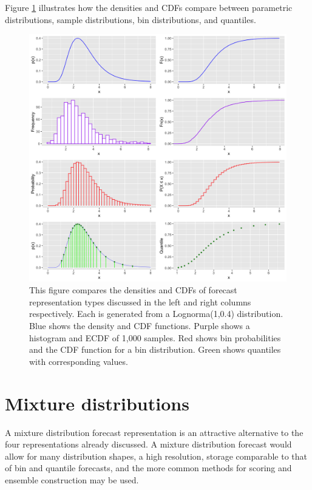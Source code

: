 \documentclass[11pt,notitlepage]{isuthesis}
\begin{document}
Figure \ref{fig:denscomp} illustrates how the densities and CDFs compare 
between parametric distributions, sample distributions, bin distributions, and
quantiles. 

\begin{figure}[htbp]
\begin{center}

\captionsetup{font=scriptsize}
\centerline{\includegraphics[scale=.1]{Images/dens_cum_comp.png}}
\begin{minipage}{10cm}
\caption[Density/CDF comparison between parametric distribution, sample 
distribution, discretized bin distribution and quantiles]{This figure compares 
the
densities and CDFs of forecast representation types discussed in the left and 
right columns respectively. Each is generated from a Lognorma(1,0.4) 
distribution. Blue shows the density and CDF functions. Purple shows a 
histogram and ECDF of 1,000 samples. Red shows bin probabilities and the CDF
function for a bin distribution. Green shows quantiles
with corresponding values.}
\label{fig:denscomp}
\end{minipage}
\end{center}
\end{figure}


\newpage

\section{Mixture distributions}
A mixture distribution forecast representation is an
attractive alternative to the four representations already discussed. 
A mixture distribution forecast
would allow for many distribution shapes, a high resolution, storage comparable
to that of bin and quantile forecasts, and the more common methods for scoring
and ensemble construction may be used.
\end{document}
